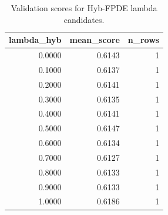 \begin{table}[t]
\caption{Validation scores for Hyb-FPDE lambda candidates.}
\label{tab:lambda_distribution_computed}
\centering
\begin{tabular}{rrr}
\toprule
lambda\_hyb & mean\_score & n\_rows \\
\midrule
0.0000 & 0.6143 & 1 \\
0.1000 & 0.6137 & 1 \\
0.2000 & 0.6141 & 1 \\
0.3000 & 0.6135 & 1 \\
0.4000 & 0.6141 & 1 \\
0.5000 & 0.6147 & 1 \\
0.6000 & 0.6134 & 1 \\
0.7000 & 0.6127 & 1 \\
0.8000 & 0.6133 & 1 \\
0.9000 & 0.6133 & 1 \\
1.0000 & 0.6186 & 1 \\
\bottomrule
\end{tabular}

\end{table}
